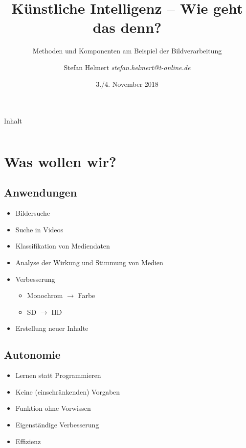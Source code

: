 \documentclass{beamer}
\title{Künstliche Intelligenz -- Wie geht das denn?}
\subtitle{Methoden und Komponenten am Beispiel der Bildverarbeitung}
\author{Stefan Helmert \emph{stefan.helmert@t-online.de}}
\institute[TU Chemnitz] %
{
  TU Chemnitz -- Professorship of Computer Graphics and Visualization
  
}
\institute[Chaostreff Chemnitz] %
{
	Chaostreff Chemnitz e.V.
	
}
\date{3./4. November 2018}
\begin{document}
\begin{frame}
  \titlepage
\end{frame}

\begin{frame}{Inhalt}

      \begin{columns}[t]
      	\begin{column}{.6\textwidth}
      		\tableofcontents[sections={1-2}]
      	\end{column}
      	\begin{column}{.4\textwidth}
      		\tableofcontents[sections={3-4}]
      	\end{column}
      \end{columns}
      	

\end{frame}


\section{Was wollen wir?}
\subsection{Anwendungen}
\begin{frame}{\insertsection}{\insertsubsection}
\begin{itemize}
	\item Bildersuche
	\item Suche in Videos
	\item Klassifikation von Mediendaten
	\item Analyse der Wirkung und Stimmung von Medien
	\item Verbesserung
	\begin{itemize}
		\item Monochrom $\rightarrow$ Farbe
		\item SD $\rightarrow$ HD
	\end{itemize}
	\item Erstellung neuer Inhalte
\end{itemize}
\end{frame}

\subsection{Autonomie}
\begin{frame}{\insertsection}{\insertsubsection}
	\begin{itemize}
		\item Lernen statt Programmieren
		\item Keine (einschränkenden) Vorgaben
		\item Funktion ohne Vorwissen
		\item Eigenständige Verbesserung
		\item Effizienz
	\end{itemize}
\end{frame}
\end{document}
